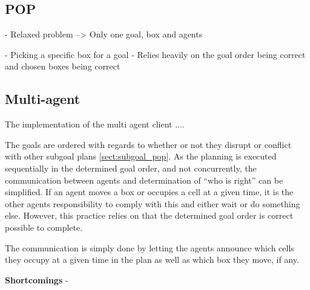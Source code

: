 \documentclass[Main]{subfiles}
\begin{document}
\subsection{POP}

- Relaxed problem --> Only one goal, box and agents

- Picking a specific box for a goal
- Relies heavily on the goal order being correct and chosen boxes being correct





\subsection{Multi-agent} 

The implementation of the multi agent client  .... 



The goals are ordered with regards to whether or not they disrupt or conflict with other subgoal plans \cref{sect:subgoal_pop}. As the planning is executed sequentially in the determined goal order, and not concurrently, the communication between agents and determination of ``who is right'' can be simplified. 
If an agent moves a box or occupies a cell at a given time, it is the other agents responsibility to comply with this and either wait or do something else. However, this practice relies on that the determined goal order is correct possible to complete. 

The communication is simply done by letting the agents announce which cells they occupy at a given time in the plan as well as which box they move, if any. 


\textbf{Shortcomings}
- 
\end{document}
